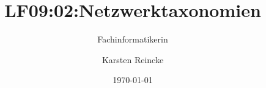 \documentclass[]{beamer}
\title{LF09:02:Netzwerktaxonomien}
\subtitle{Fachinformatikerin}
\institute[GS-LDK]{Gewerbliche Schulen Dillenburg}
\author{Karsten Reincke}
\date{\today}
\def\cfgGl{../../../cfg.gl/}
\begin{document}

\begin{frame}
  \titlepage

  
\end{frame}






\logo{}
\newpage



%
\end{document}
